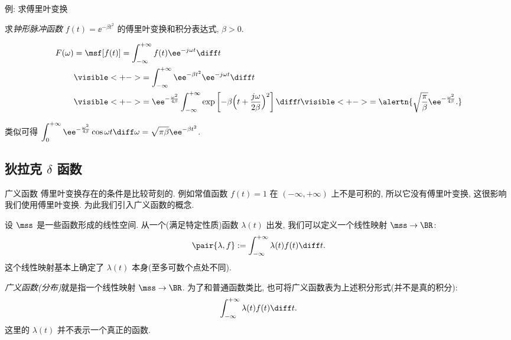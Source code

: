 \begin{frame}{例: 求傅里叶变换}
	\onslide<+->
	\begin{example}
		求\emph{钟形脉冲函数} $f(t)=\ee^{-\beta t^2}$ 的傅里叶变换和积分表达式, $\beta>0$.
	\end{example}

	\onslide<+->
	\begin{solution}
		\vspace{-\baselineskip}
		\begin{align*}
			F(\omega)&=\msf[f(t)]=\int_{-\infty}^{+\infty}f(t)\ee^{-j\omega t}\diff t\\
			&\visible<+->{=\int_{-\infty}^{+\infty}\ee^{-\beta t^2}\ee^{-j\omega t}\diff t}\\
			&\visible<+->{=\ee^{-\frac{\omega^2}{4\beta}}\int_{-\infty}^{+\infty}\exp\left[-\beta\Bigl(t+\frac{j\omega}{2\beta}\Bigr)^2\right]\diff t}
			\visible<+->{=\alertn{\sqrt{\frac\pi\beta}\ee^{-\frac{\omega^2}{4\beta}}.}}
		\end{align*}
	\end{solution}

	\onslide<+->
	类似可得
	$\displaystyle\int_0^{+\infty}\ee^{-\frac{\omega^2}{4\beta}}\cos\omega t\diff\omega=\sqrt{\pi\beta}\ee^{-\beta t^2}$.
\end{frame}


\subsection{狄拉克 \texorpdfstring{$\delta$}{δ} 函数}

\begin{frame}{广义函数}
	\onslide<+->
	傅里叶变换存在的条件是比较苛刻的.
	\onslide<+->
	例如常值函数 $f(t)=1$ 在 $(-\infty,+\infty)$ 上不是可积的, 所以它没有傅里叶变换, 这很影响我们使用傅里叶变换.
	\onslide<+->
	为此我们引入广义函数的概念.

	\onslide<+->
	设 $\mss$ 是一些函数形成的线性空间.
	\onslide<+->
	从一个(满足特定性质)函数 $\lambda(t)$ 出发, 我们可以定义一个线性映射 $\mss\to \BR$:
	\[\pair{\lambda,f}:=\int_{-\infty}^{+\infty}\lambda(t)f(t)\diff t.
	\]
	\onslide<+->
	这个线性映射基本上确定了 $\lambda(t)$ 本身(至多可数个点处不同).

	\onslide<+->
	\emph{广义函数(分布)}就是指一个线性映射 $\mss\to \BR$.
	\onslide<+->
	为了和普通函数类比, 也可将广义函数表为上述积分形式(并不是真的积分):
	\[\int_{-\infty}^{+\infty}\lambda(t)f(t)\diff t.
	\]
	这里的 $\lambda(t)$ 并不表示一个真正的函数.
\end{frame}


